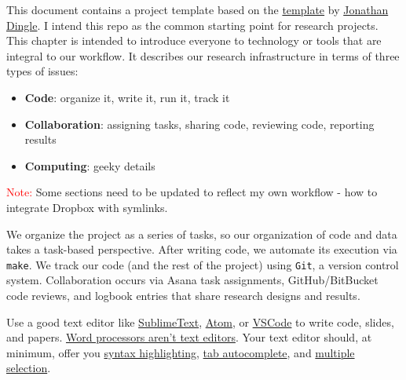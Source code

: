 This document contains a project template based on 
the \href{https://github.com/jrm87/projecttemplate}{template} by \href{http://www.jdingel.com/}{Jonathan Dingle}. 
I intend this repo as the common starting point for research projects. This chapter is intended to introduce everyone to technology or tools that are integral to our workflow.
It describes our research infrastructure in terms of three types of issues:
\begin{itemize}
\item \textbf{Code}: organize it, write it, run it, track it
\item \textbf{Collaboration}: assigning tasks, sharing code, reviewing code, reporting results
\item \textbf{Computing}: geeky details
\end{itemize}

\textcolor{red}{Note:} Some sections need to be updated to reflect my own workflow - 
how to integrate Dropbox with symlinks. 

We organize the project as a series of tasks, so our organization of code and data takes a task-based perspective.
After writing code, we automate its execution via \texttt{make}.
We track our code (and the rest of the project) using \texttt{Git}, a version control system.
Collaboration occurs via Asana task assignments, GitHub/BitBucket code reviews, and logbook entries that share research designs and results.

Use a good text editor like
\href{https://www.sublimetext.com/}{SublimeText},
\href{https://atom.io/}{Atom},
or
\href{https://code.visualstudio.com/}{VSCode}
to write code, slides, and papers.
\href{http://plain-text.co/write-and-edit.html}{Word processors aren't text editors}.
Your text editor should, at minimum, offer you
\href{https://en.wikipedia.org/wiki/Syntax_highlighting}{syntax highlighting},
\href{https://en.wikipedia.org/wiki/Command-line_completion}{tab autocomplete},
and \href{https://www.sublimetext.com/}{multiple selection}.


